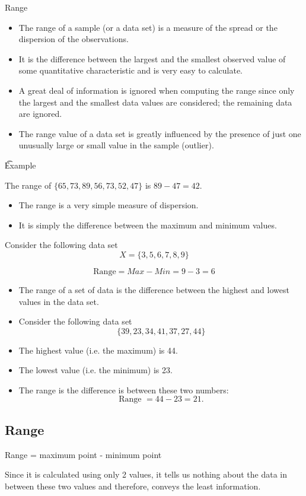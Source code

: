 



{
	{Range}

\begin{itemize}
\item The range of a sample (or a data set) is a measure of the spread or the dispersion of the observations. \item It is the difference between the largest and the smallest observed value of some quantitative characteristic and is very easy to calculate.
\smallskip
\item A great deal of information is ignored when computing the range since only the largest and the smallest data values are considered; the remaining data are ignored.
\smallskip
\item The range value of a data set is greatly influenced by the presence of just one unusually large or small value in the sample (outlier).
\end{itemize}

\t{Example}


The range of $\{65,73,89,56,73,52,47\}$ is $ 89-47 = 42$.


}




\begin{itemize}
\item The range is a very simple measure of dispersion.
\item It is simply the difference between the maximum and minimum values.
\end{itemize}

Consider the following data set
\[ X= \{3,5,6,7,8,9\}\]

\[\mbox{Range} =  Max - Min = 9-3 = 6 \]









\begin{itemize}
\item The range of a set of data is the difference between the highest and lowest values in the data set.
\item Consider the following data set
\[  \{  39,  23,  34,  41,  37,  27,  44 \}\]
\item The highest value (i.e. the maximum) is 44.
\item The lowest value (i.e. the minimum) is 23.
\item The range is the difference is between these two numbers: 
\[ \mbox{Range } = 44 - 23 = 21. \] 
\end{itemize}


\subsection{Range}
Range = maximum point  - minimum point

Since it is calculated using only 2 values, it tells us nothing about the data in between these two values and therefore, conveys the least information.




